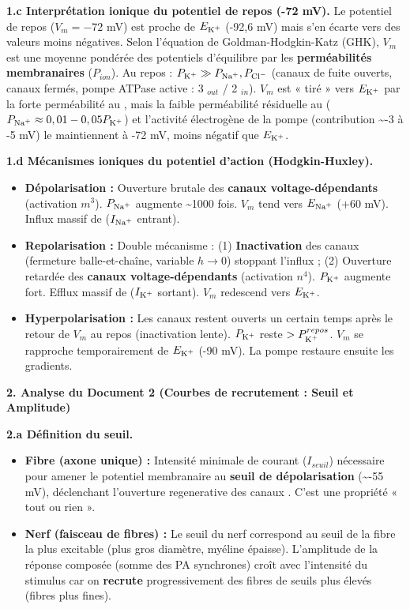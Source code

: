 \documentclass[11pt]{article}
\begin{document}
\begin{exoresolu}
\textbf{1.c Interprétation ionique du potentiel de repos (-72 mV).}
Le potentiel de repos ($V_m = -72$ mV) est proche de $E_{\ce{K+}}$ (-92,6 mV) mais s'en écarte vers des valeurs moins négatives. Selon l'équation de Goldman-Hodgkin-Katz (GHK), $V_m$ est une moyenne pondérée des potentiels d'équilibre par les \textbf{perméabilités membranaires} ($P_{ion}$).
Au repos : $P_{\ce{K+}} \gg P_{\ce{Na+}}, P_{\ce{Cl-}}$ (canaux de fuite  ouverts, canaux  fermés, pompe  ATPase active : 3 $_{out}$ / 2 $_{in}$).
$V_m$ est « tiré » vers $E_{\ce{K+}}$ par la forte perméabilité au , mais la faible perméabilité résiduelle au  ($P_{\ce{Na+}} \approx 0,01 - 0,05 P_{\ce{K+}}$) et l'activité électrogène de la pompe (contribution \textasciitilde -3 à -5 mV) le maintiennent à -72 mV, moins négatif que $E_{\ce{K+}}$.

\textbf{1.d Mécanismes ioniques du potentiel d'action (Hodgkin-Huxley).}
\begin{itemize}
    \item \textbf{Dépolarisation :} Ouverture brutale des \textbf{canaux  voltage-dépendants} (activation $m^3$). $P_{\ce{Na+}}$ augmente \textasciitilde 1000 fois. $V_m$ tend vers $E_{\ce{Na+}}$ (+60 mV). Influx massif de  ($I_{\ce{Na+}}$ entrant).
    \item \textbf{Repolarisation :} Double mécanisme : (1) \textbf{Inactivation} des canaux  (fermeture balle-et-chaîne, variable $h \to 0$) stoppant l'influx  ; (2) Ouverture retardée des \textbf{canaux  voltage-dépendants} (activation $n^4$). $P_{\ce{K+}}$ augmente fort. Efflux massif de  ($I_{\ce{K+}}$ sortant). $V_m$ redescend vers $E_{\ce{K+}}$.
    \item \textbf{Hyperpolarisation :} Les canaux  restent ouverts un certain temps après le retour de $V_m$ au repos (inactivation lente). $P_{\ce{K+}}$ reste $> P_{\ce{K+}}^{repos}$. $V_m$ se rapproche temporairement de $E_{\ce{K+}}$ (-90 mV). La pompe  restaure ensuite les gradients.
\end{itemize}

\textbf{2. Analyse du Document 2 (Courbes de recrutement : Seuil et Amplitude)}

\textbf{2.a Définition du seuil.}
\begin{itemize}
    \item \textbf{Fibre (axone unique) :} Intensité minimale de courant ($I_{seuil}$) nécessaire pour amener le potentiel membranaire au \textbf{seuil de dépolarisation} (\textasciitilde -55 mV), déclenchant l'ouverture regenerative des canaux . C'est une propriété « tout ou rien ».
    \item \textbf{Nerf (faisceau de fibres) :} Le seuil du nerf correspond au seuil de la fibre la plus excitable (plus gros diamètre, myéline épaisse). L'amplitude de la réponse composée (somme des PA synchrones) croît avec l'intensité du stimulus car on \textbf{recrute} progressivement des fibres de seuils plus élevés (fibres plus fines).
\end{itemize}


\end{exoresolu}
\end{document}
